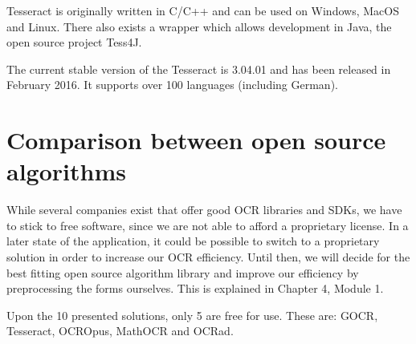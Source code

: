 Tesseract is originally written in C/C++ and can be used on Windows, MacOS and Linux. There also exists a wrapper which allows development in Java, the open source project Tess4J.

The current stable version of the Tesseract is 3.04.01 and has been released in February 2016. It supports over 100 languages (including German). 

\label{OCRComparison}
\section{Comparison between open source algorithms}
While several companies exist that offer good OCR libraries and SDKs, we have to stick to free software, since we are not able to afford a proprietary license. In a later state of the application, it could be possible to switch to a proprietary solution in order to increase our OCR efficiency. Until then, we will decide for the best fitting open source algorithm library and improve our efficiency by preprocessing the forms ourselves. This is explained in Chapter 4, Module 1.

Upon the 10 presented solutions, only 5 are free for use. These are: GOCR, Tesseract, OCROpus, MathOCR and OCRad.

